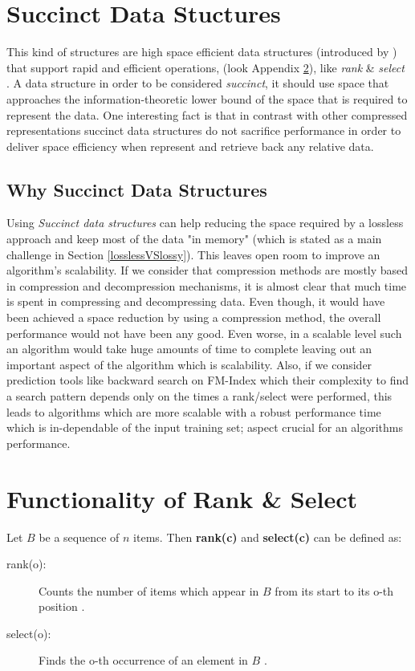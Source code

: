 \newpage
\appendix


\section{Succinct Data Stuctures} \label{App:SDS}
This kind of structures are high space efficient data structures (introduced by \citeauthor{Jacobson89} \citeyear{Jacobson89}) that support rapid and efficient operations, (look Appendix \ref{App:rank_select}), like \emph{rank} \& \emph{select} \cite{dillabaugh_2007, Jacobson89}. A data structure in order to be considered \emph{succinct}, it should use space that approaches the information-theoretic lower bound of the space that is required to represent the data. One interesting fact is that in contrast with other compressed representations succinct data structures do not sacrifice performance in order to deliver space efficiency when represent and retrieve back any relative data. 
\subsection{Why Succinct Data Structures}
Using \emph{Succinct data structures} can help reducing the space required by a lossless approach and keep most of the data "in memory" (which is stated as a main challenge in Section \ref{losslessVSlossy}). This leaves open room to improve an algorithm's scalability. If we consider that compression methods are mostly based in compression and decompression mechanisms, it is almost clear that much time is spent in compressing and decompressing data. Even though, it would have been achieved a space reduction by using a compression method, the overall performance would not have been any good. Even worse, in a scalable level such an algorithm would take huge amounts of time to complete leaving out an important aspect of the algorithm which is scalability. Also, if we consider prediction tools like backward search on FM-Index \cite{Ferragina} which their complexity to find a search pattern depends only on the times a rank/select were performed, this leads to algorithms which are more scalable with a robust performance time which is in-dependable of the input training set; aspect crucial for an algorithms performance.



\section{Functionality of Rank \& Select}\label{App:rank_select}
Let \(B\) be a sequence of \(n\) items. Then \textbf{rank(c)} and \textbf{select(c)} can be defined as:
\begin{description}
  \item[rank(o):] 
  Counts the number of items which appear in \(B\) from its start to its o-th position \cite{Jacobson89}.
  \item[select(o):]
  Finds the o-th occurrence of an element in \(B\) \cite{Jacobson89}.
\end{description}

